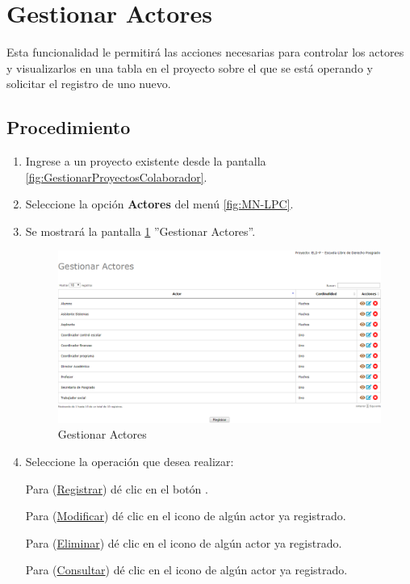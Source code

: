 \hypertarget{cv:gestionarActores}{\section{Gestionar Actores}} \label{sec:GestionarActores}

	Esta funcionalidad le permitirá las acciones necesarias para controlar los actores y visualizarlos en una tabla en el proyecto sobre el que se está operando y solicitar el registro de uno nuevo.

		\subsection{Procedimiento}

			\begin{enumerate}
				
			\item Ingrese a un proyecto existente desde la pantalla \ref{fig:GestionarProyectosColaborador}.
	
			\item Seleccione la opción \textbf{Actores} del menú \ref{fig:MN-LPC}.
	
			\item Se mostrará la pantalla \ref{fig:GestionarActores} ''Gestionar Actores''.

			\begin{figure}[h!]
				\begin{center}
					\includegraphics[scale=0.5]{roles/lider/actor/pantallas/IU10gestionarActores}
					\caption{Gestionar Actores}
					\label{fig:GestionarActores}
				\end{center}
			\end{figure}
		
				\item Seleccione la operación que desea realizar:
			
			Para (\hyperlink{cv:registrarActor}{Registrar}) dé clic en el botón \IURegistrar.
			
			Para (\hyperlink{cv:modificarActor}{Modificar}) dé clic en el icono \IUEditar{} de algún actor ya registrado.
			
			Para (\hyperlink{cv:eliminarActor}{Eliminar}) dé clic en el icono \IUBotonEliminar{} de algún actor ya registrado.
			
			Para (\hyperlink{cv:consultarActor}{Consultar}) dé clic en el icono \IUConsultar{} de algún actor ya registrado.
			\end{enumerate}